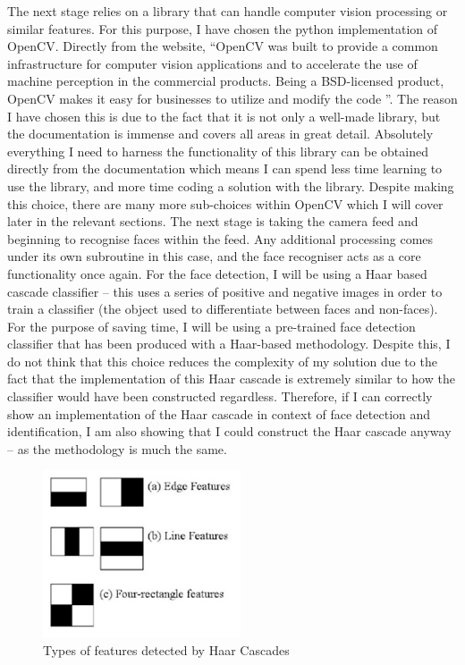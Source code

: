 \documentclass[9pt]{article}
\begin{document}
The next stage relies on a library that can handle computer vision processing or similar features. For this purpose, I have chosen the python implementation of OpenCV. 
Directly from the website, ``OpenCV was built to provide a common infrastructure for computer vision applications and to accelerate the use of machine perception in the commercial products. Being a BSD-licensed product, OpenCV makes it easy for businesses to utilize and modify the code \cite{openCvAbout}”. The reason I have chosen this is due to the fact that it is not only a well-made library, but the documentation is immense and covers all areas in great detail. Absolutely everything I need to harness the functionality of this library can be obtained directly from the documentation which means I can spend less time learning to use the library, and more time coding a solution with the library. Despite making this choice, there are many more sub-choices within OpenCV which I will cover later in the relevant sections.
The next stage is taking the camera feed and beginning to recognise faces within the feed. Any additional processing comes under its own subroutine in this case, and the face recogniser acts as a core functionality once again. For the face detection, I will be using a Haar based cascade classifier – this uses a series of positive and negative images in order to train a classifier (the object used to differentiate between faces and non-faces). For the purpose of saving time, I will be using a pre-trained face detection classifier that has been produced with a Haar-based methodology. Despite this, I do not think that this choice reduces the complexity of my solution due to the fact that the implementation of this Haar cascade is extremely similar to how the classifier would have been constructed regardless. Therefore, if I can correctly show an implementation of the Haar cascade in context of face detection and identification, I am also showing that I could construct the Haar cascade anyway – as the methodology is much the same.
\begin{figure}[H]
	\centering
	\includegraphics{haarCascades.png}
	\caption{Types of features detected by Haar Cascades \cite{haarImage}}\label{fig_haar}
\end{figure}
\end{document}
